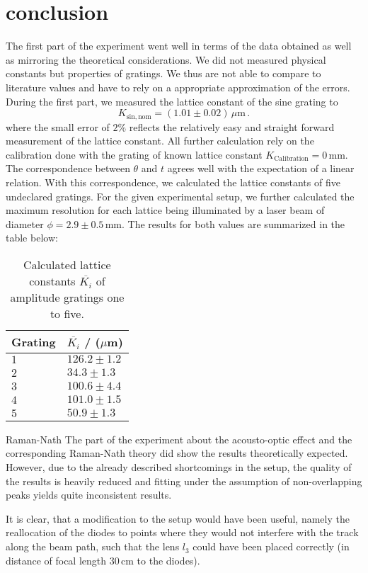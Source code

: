 \section{conclusion}
The first part of the experiment went well in terms of the data obtained as well 
as mirroring the theoretical considerations. We did not measured 
physical constants but properties of gratings. We thus are not able to compare to 
literature values and have to rely on a appropriate approximation of the errors.
During the first part, 
we measured the lattice constant of the sine grating to 
\begin{equation}
    K_\mathrm{sin, nom} =(1.01 \pm 0.02) \, \mu\mathrm{m} \,.
\end{equation}
where the small error of $2\%$ reflects the relatively easy 
and straight forward measurement of the lattice constant. 
All further calculation rely on the calibration done with the 
grating of known lattice constant $K_\mathrm{Calibration} = 0\,$mm.
The correspondence between $\theta$ and $t$ agrees well 
with the expectation of a linear relation. 
With this correspondence, we calculated the lattice constants of five 
undeclared gratings. For the given experimental setup, we further calculated 
the maximum resolution for each lattice being illuminated by a laser beam of 
diameter $\phi = 2.9 \pm 0.5\,$mm.
The results for both values are summarized in the table below:
\begin{table}[H]
    \centering
	\begin{tabular}{|p{3.82cm}|p{3.82cm}|}
		\hline
		\rowcolor{tabcolor}
		Grating & $\overline{K_i}$ / ($\mu$m)  \\ \hline
		$1$  & $ 126.2 \pm 1.2$ \\
		$2$  & $ 34.3 \pm 1.3$ \\
		$3$  & $ 100.6 \pm 4.4$ \\
		$4$  & $ 101.0 \pm 1.5$ \\
		$5$  & $ 50.9 \pm 1.3$ \\
		\hline
	\end{tabular}
    \caption{
        Calculated lattice constants $\overline{K_i}$ of amplitude gratings one to five. 
        }
    \label{tab:gratings_K_conc}
\end{table}




Raman-Nath
The part of the experiment about the acousto-optic effect and the corresponding 
Raman-Nath theory did show the results theoretically expected. However, 
due to the already described shortcomings in the setup, the quality of the 
results is heavily reduced and fitting under the assumption of non-overlapping 
peaks yields quite inconsistent results. 

It is clear, that a modification to the setup would have been useful, 
namely the reallocation of the diodes to points where they would not interfere 
with the track along the beam path, such that the lens $l_3$ could have been placed 
correctly (in distance of focal length $30\,$cm to the diodes). 
